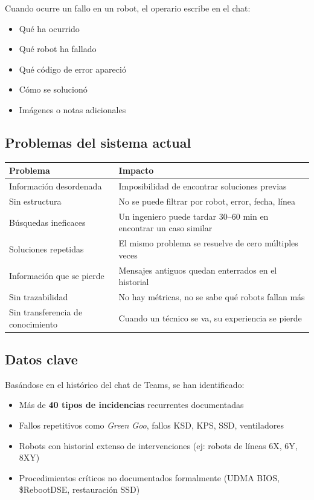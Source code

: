 \documentclass[11pt,a4paper]{article}
\begin{document}
Cuando ocurre un fallo en un robot, el operario escribe en el chat:
\begin{itemize}[noitemsep]
    \item Qué ha ocurrido
    \item Qué robot ha fallado
    \item Qué código de error apareció
    \item Cómo se solucionó
    \item Imágenes o notas adicionales
\end{itemize}

\subsection{Problemas del sistema actual}

\begin{center}
\begin{tabularx}{\textwidth}{lX}
\toprule
\textbf{Problema} & \textbf{Impacto} \\
\midrule
Información desordenada & Imposibilidad de encontrar soluciones previas \\
Sin estructura & No se puede filtrar por robot, error, fecha, línea \\
Búsquedas ineficaces & Un ingeniero puede tardar 30--60 min en encontrar un caso similar \\
Soluciones repetidas & El mismo problema se resuelve de cero múltiples veces \\
Información que se pierde & Mensajes antiguos quedan enterrados en el historial \\
Sin trazabilidad & No hay métricas, no se sabe qué robots fallan más \\
Sin transferencia de conocimiento & Cuando un técnico se va, su experiencia se pierde \\
\bottomrule
\end{tabularx}
\end{center}

\subsection{Datos clave}

Basándose en el histórico del chat de Teams, se han identificado:
\begin{itemize}[noitemsep]
    \item Más de \textbf{40 tipos de incidencias} recurrentes documentadas
    \item Fallos repetitivos como \textit{Green Goo}, fallos KSD, KPS, SSD, ventiladores
    \item Robots con historial extenso de intervenciones (ej: robots de líneas 6X, 6Y, 8XY)
    \item Procedimientos críticos no documentados formalmente (UDMA BIOS, \$RebootDSE, restauración SSD)
\end{itemize}
\end{document}
